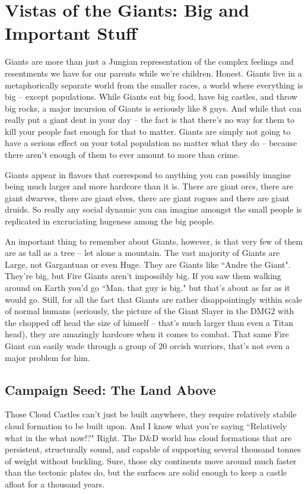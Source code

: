 \section{Vistas of the Giants: Big and Important Stuff}

Giants are more than just a Jungian representation of the complex feelings and resentments we have for our parents while we're children. Honest. Giants live in a metaphorically separate world from the smaller races, a world where everything is big -- except populations. While Giants eat big food, have big castles, and throw big rocks, a major incursion of Giants is seriously like 8 guys. And while that can really put a giant dent in your day -- the fact is that there's no way for them to kill your people fast enough for that to matter. Giants are simply not going to have a serious effect on your total population no matter what they do -- because there aren't enough of them to ever amount to more than crime.

Giants appear in flavors that correspond to anything you can possibly imagine being much larger and more hardcore than it is. There are giant orcs, there are giant dwarves, there are giant elves, there are giant rogues and there are giant druids. So really any social dynamic you can imagine amongst the small people is replicated in excruciating hugeness among the big people.

An important thing to remember about Giants, however, is that very few of them are as tall as a tree -- let alone a mountain. The vast majority of Giants are Large, not Gargantuan or even Huge. They are Giants like ``Andre the Giant". They're big, but Fire Giants aren't impossibly big. If you saw them walking around on Earth you'd go ``Man, that guy is big." but that's about as far as it would go. Still, for all the fact that Giants are rather disappointingly within scale of normal humans (seriously, the picture of the Giant Slayer in the DMG2 with the chopped off head the size of himself -- that's much larger than even a Titan head), they are amazingly hardcore when it comes to combat. That same Fire Giant can easily wade through a group of 20 orcish warriors, that's not even a major problem for him.

\subsection{Campaign Seed: The Land Above}
Those Cloud Castles can't just be built anywhere, they require relatively stabile cloud formation to be built upon. And I know what you're saying ``Relatively what in the what now!?" Right. The D\&D world has cloud formations that are persistent, structurally sound, and capable of supporting several thousand tonnes of weight without buckling. Sure, those sky continents move around much faster than the tectonic plates do, but the surfaces are solid enough to keep a castle afloat for a thousand years.

